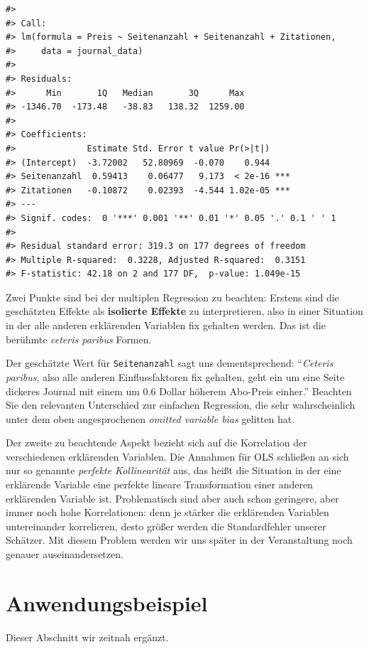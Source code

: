 \documentclass[]{book}
\begin{document}
\begin{verbatim}
#> 
#> Call:
#> lm(formula = Preis ~ Seitenanzahl + Seitenanzahl + Zitationen, 
#>     data = journal_data)
#> 
#> Residuals:
#>      Min       1Q   Median       3Q      Max 
#> -1346.70  -173.48   -38.83   138.32  1259.00 
#> 
#> Coefficients:
#>              Estimate Std. Error t value Pr(>|t|)    
#> (Intercept)  -3.72002   52.80969  -0.070    0.944    
#> Seitenanzahl  0.59413    0.06477   9.173  < 2e-16 ***
#> Zitationen   -0.10872    0.02393  -4.544 1.02e-05 ***
#> ---
#> Signif. codes:  0 '***' 0.001 '**' 0.01 '*' 0.05 '.' 0.1 ' ' 1
#> 
#> Residual standard error: 319.3 on 177 degrees of freedom
#> Multiple R-squared:  0.3228, Adjusted R-squared:  0.3151 
#> F-statistic: 42.18 on 2 and 177 DF,  p-value: 1.049e-15
\end{verbatim}

Zwei Punkte sind bei der multiplen Regression zu beachten: Erstens sind
die geschätzten Effekte als \textbf{isolierte Effekte} zu
interpretieren, also in einer Situation in der alle anderen erklärenden
Variablen fix gehalten werden. Das ist die berühmte \emph{ceteris
paribus} Formen.

Der geschätzte Wert für \texttt{Seitenanzahl} sagt uns dementsprechend:
``\emph{Ceteris paribus}, also alle anderen Einflussfaktoren fix
gehalten, geht ein um eine Seite dickeres Journal mit einem um \(0.6\)
Dollar höherem Abo-Preis einher.'' Beachten Sie den relevanten
Unterschied zur einfachen Regression, die sehr wahrscheinlich unter dem
oben angesprochenen \emph{omitted variable bias} gelitten hat.

Der zweite zu beachtende Aspekt bezieht sich auf die Korrelation der
verschiedenen erklärenden Variablen. Die Annahmen für OLS schließen an
sich nur so genannte \emph{perfekte Kollinearität} aus, das heißt die
Situation in der eine erklärende Variable eine perfekte lineare
Transformation einer anderen erklärenden Variable ist. Problematisch
sind aber auch schon geringere, aber immer noch hohe Korrelationen: denn
je stärker die erklärenden Variablen untereinander korrelieren, desto
größer werden die Standardfehler unserer Schätzer. Mit diesem Problem
werden wir uns später in der Veranstaltung noch genauer
auseinandersetzen.

\section{Anwendungsbeispiel}\label{anwendungsbeispiel}

Dieser Abschnitt wir zeitnah ergänzt.
\end{document}
